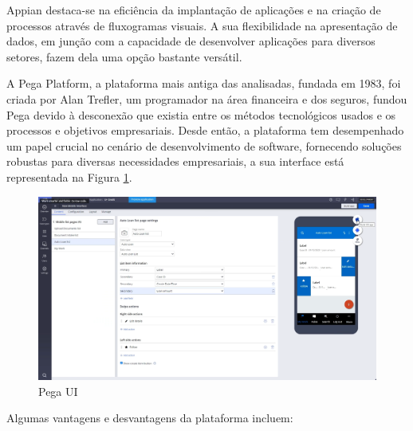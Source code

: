         Appian destaca-se na eficiência da implantação de aplicações e na criação de processos através de fluxogramas visuais. A sua flexibilidade na apresentação de dados, em junção com a capacidade de desenvolver aplicações para diversos setores, fazem dela uma opção bastante versátil\cite{mendix-vs-outsystems-vs-appian}.

    \label{secsecsec:pega}
    

        A Pega Platform, a plataforma mais antiga das analisadas, fundada em 1983, foi criada por Alan Trefler, um programador na área financeira e dos seguros, fundou Pega devido à desconexão que existia entre os métodos tecnológicos usados e os processos e objetivos empresariais. Desde então, a plataforma tem desempenhado um papel crucial no cenário de desenvolvimento de software, fornecendo soluções robustas para diversas necessidades empresariais, a sua interface está representada na Figura \ref{fig:pega-ui}.

        \begin{figure}[htbp] %
            \centering
            \includegraphics[width=\textwidth]{imgs/PegaUI.png} %
            \caption{Pega UI}\label{fig:pega-ui}
        \end{figure}

        Algumas vantagens e desvantagens da plataforma incluem:
    
